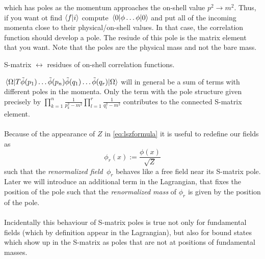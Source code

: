 which has poles as the momentum approaches the on-shell value $p^2 \rightarrow m^2$. Thus, if you want ot find $\braket{f}{i}$ compute $\expval{\phi\dots \phi}{0}$ and put all of the incoming momenta close to their physical/on-shell values. In that case, the correlation function should develop a pole. The resiude of this pole is the matrix element that you want. Note that the poles are the physical mass and not the bare mass.
\begin{statements}
	S-matrix $\leftrightarrow$ residues of on-shell correlation functions.
\end{statements}
$\expval{T\tilde{\phi}(p_1) \dots \tilde{\phi}(p_n) \tilde{\phi}(q_1)\dots \tilde{\phi}(q_r)}{\Omega} $ will in general be a sum of terms with different poles in the momenta. Only the term with the pole structure given precisely by $\prod_{k=1}^{n} \frac{1}{p^2_k - m^2} \prod_{l=1}^{r} \frac{1}{q^2_l-m^2}$ contributes to the connected S-matrix element.
\\
\\
Because of the appearance of $Z$ in \ref{eq:lszformula} it is useful to redefine our fields as
\begin{equation}
	\label{eq:renormalizedfield}
	\phi_r(x) := \frac{\phi(x)}{\sqrt{Z}}
\end{equation}
such that the \emph{renormalized field\ $\phi_r$} behaves like a free field near its S-matrix pole. Later we will introduce an additional term in the Lagrangian, that fixes the position of the pole such that the \emph{renormalized mass} of $\phi_r$ is given by the position of the pole.\\
	\\
	Incidentally this behaviour of S-matrix poles is true not only for fundamental fields (which by definition appear in the Lagrangian), but also for bound states which show up in the S-matrix as poles that are not at positions of fundamental masses.


